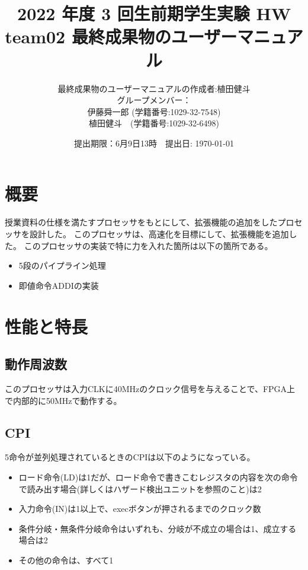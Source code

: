 \documentclass[a4j,titlepage]{jarticle}
\begin{document}
\title{2022 年度 3 回生前期学生実験 HW  \\ \bf team02 最終成果物のユーザーマニュアル}
\author{最終成果物のユーザーマニュアルの作成者:植田健斗\\
グループメンバー：\\伊藤舜一郎 (学籍番号:1029-32-7548)
\\植田健斗　(学籍番号:1029-32-6498)}
\date{提出期限：6月9日13時　提出日: \today} %
\maketitle
\newpage

\section{概要}
授業資料の仕様を満たすプロセッサをもとにして、拡張機能の追加をしたプロセッサを設計した。
このプロセッサは、高速化を目標にして、拡張機能を追加した。
このプロセッサの実装で特に力を入れた箇所は以下の箇所である。
\begin{itemize}
\item 5段のパイプライン処理
\item 即値命令ADDIの実装
\end{itemize}

\section{性能と特長}
\subsection{動作周波数}
このプロセッサは入力CLKに40MHzのクロック信号を与えることで、FPGA上で内部的に50MHzで動作する。
\subsection{CPI}
5命令が並列処理されているときのCPIは以下のようになっている。
\begin{itemize}
\item ロード命令(LD)は1だが、ロード命令で書きこむレジスタの内容を次の命令で読み出す場合(詳しくはハザード検出ユニットを参照のこと)は2
\item 入力命令(IN)は1以上で、execボタンが押されるまでのクロック数
\item 条件分岐・無条件分岐命令はいずれも、分岐が不成立の場合は1、成立する場合は2
\item その他の命令は、すべて1
\end{itemize}
\end{document}
